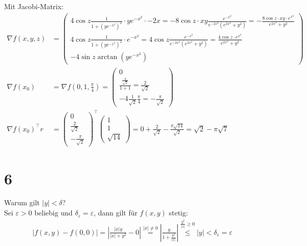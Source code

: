\documentclass[11pt,a4paper]{article}
\newcommand{\1}    	{\mathbbm{1}}
\begin{document}
	\noindent
	Mit Jacobi-Matrix:
	\begin{align*}
		\nabla f (x,y,z) &= \left( \begin{array}{c}
			4 \cos z \frac{1}{1 + \left( ye^{-x^2} \right)^2}	\cdot y e^{-x^2} \cdot -2x = 
			-8 \cos z \cdot xy \frac{e^{-x^2}}{e^{-2x^2} \left( e^{2x^2} + y^2 \right)} = 
			- \frac{8 \cos z \cdot xy \cdot e^{x^2}}{e^{2x^2} + y^2} \\
			4 \cos z \frac{1}{1 + \left( ye^{-x^2} \right)^2} \cdot e^{-x^2} = 
			4 \cos z \frac{e^{-x^2}}{e^{-2x^2} \left( e^{2x^2} + y^2 \right)} = 
			\frac{4 \cos z \cdot e^{x^2} }{e^{2x^2} + y^2}\\
			- 4 \sin z \arctan \left( y e^{-x^2} \right)
		\end{array} \right) \\
		\nabla f\left( x_0 \right) &= 
		\nabla f\left( 0,1,\frac{\pi}{4} \right) = \left( \begin{array}{c}
			0 \\
			\frac{\frac{4}{\sqrt{2}}}{1 + 1} = \frac{2}{\sqrt{2}} \\
			-4 \frac{1}{\sqrt{2}} \frac{\pi}{4} = - \frac{\pi}{\sqrt{2}}
		\end{array} \right) \\
		\nabla f\left( x_0 \right)^\top r &= \left( \begin{array}{c}
			0 \\
			\frac{2}{\sqrt{2}} \\
			- \frac{\pi}{\sqrt{2}}
		\end{array} \right)^\top \left( \begin{array}{c}
			1 \\ 1 \\ \sqrt{14}
		\end{array} \right) = 0 + \frac{2}{\sqrt{2}} - \frac{\pi \sqrt{14}}{\sqrt{2}} = \sqrt{2} - \pi \sqrt{7}
	\end{align*}
	
	\section*{6}
	\color{red}
	Warum gilt \(\vert y \vert < \delta\)? 
	\color{black} \\
	Sei \(\varepsilon > 0\) beliebig und \(\delta_\varepsilon = \varepsilon\), dann gilt für \(f(x,y)\) stetig:
	\begin{align*}
		\left\vert f(x,y) - f(0,0) \right\vert = 
		\left\vert \frac{\vert x \vert y}{\vert x \vert + y^2} - 0\right\vert \stackrel{\vert x \vert \neq 0}{=} 
		\left\vert \frac{y}{1 + \frac{y^2}{\vert x \vert}} \right\vert \stackrel{\frac{y^2}{\vert x \vert} \geqslant 0}{\leqslant}
		\vert y \vert < \delta_\varepsilon = \varepsilon
	\end{align*}
	
\end{document}
